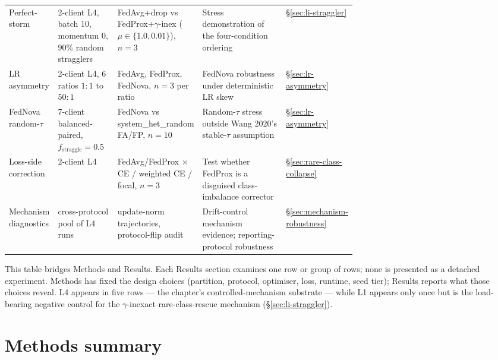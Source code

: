 \documentclass[11pt,a4paper]{report}
\begin{document}
\begin{table}[H]
{\begin{tabular}{l p{0.18\linewidth} p{0.22\linewidth} p{0.28\linewidth} l}
Perfect-storm                    & 2-client L4, batch $10$, momentum $0$, $90\%$ random stragglers & FedAvg+drop vs FedProx+$\gamma$-inex ($\mu \in \{1.0, 0.01\}$), $n = 3$ & Stress demonstration of the four-condition ordering                        & §\ref{sec:li-straggler}                         \\
LR asymmetry                     & 2-client L4, 6 ratios $1{:}1$ to $50{:}1$    & FedAvg, FedProx, FedNova, $n = 3$ per ratio              & FedNova robustness under deterministic LR skew                                & §\ref{sec:lr-asymmetry}                         \\
FedNova random-$\tau$            & 7-client balanced-paired, $f_{\textrm{straggle}} = 0.5$ & FedNova vs system\_het\_random FA/FP, $n = 10$           & Random-$\tau$ stress outside Wang 2020's stable-$\tau$ assumption             & §\ref{sec:lr-asymmetry}                         \\
Loss-side correction             & 2-client L4                                  & FedAvg/FedProx $\times$ CE / weighted CE / focal, $n = 3$ & Test whether FedProx is a disguised class-imbalance corrector                & §\ref{sec:rare-class-collapse}                  \\
Mechanism diagnostics            & cross-protocol pool of L4 runs               & update-norm trajectories, protocol-flip audit             & Drift-control mechanism evidence; reporting-protocol robustness               & §\ref{sec:mechanism-robustness}                  \\
\hline
\end{tabular}%
}
\end{table}

This table bridges Methods and Results. Each Results section examines
one row or group of rows; none is presented as a detached experiment.
Methods has fixed the design choices (partition, protocol, optimiser,
loss, runtime, seed tier); Results reports what those choices reveal.
L4 appears in five rows --- the chapter's controlled-mechanism
substrate --- while L1 appears only once but is the load-bearing
negative control for the $\gamma$-inexact rare-class-rescue mechanism
(§\ref{sec:li-straggler}).

\section{Methods summary}
\label{sec:method-summary}
\end{document}
